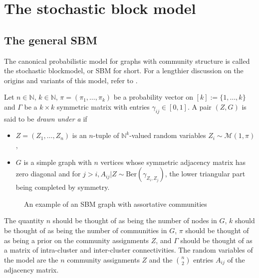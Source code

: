 \documentclass[../../main.tex]{subfiles} %
\begin{document}
\section{The stochastic block model}

\subsection{The general SBM}
The canonical probabilistic model for graphs with community structure is called 
the 
stochastic blockmodel, or SBM for short. For a lengthier discussion on the 
origins and variants of this model, refer to \cite{abbe_community_2017}. 

\begin{definition} \label{def:sbm}
	Let \(n \in \mathbb N\), \(k \in \mathbb N\), \(\pi = (\pi_1, \dots, 
	\pi_k)\) be a probability vector on \([k] := \{1, \dots, k\}\) and  
	\(\Gamma\) be a \(k \times k\) symmetric matrix with entries \(\gamma_{ij} 
	\in [0, 1]\). A pair \((Z, G)\) is said to be \textit{drawn under a 
	} if 
	\begin{itemize}
		\item \(Z = (Z_1, \dots, Z_n)\) is an \(n\)-tuple of \(\mathbb 
		N^k\)-valued random variables \(Z_i \sim \mathcal M (1, \pi)\),
		\item \(G\) is a simple graph with \(n\) vertices whose symmetric 
		adjacency matrix has zero diagonal and for \(j > i, A_{ij} \vert Z \sim 
		\text{Ber}(\gamma_{Z_i, Z_j})\), the lower triangular part being 
		completed by symmetry.
	\end{itemize}
\end{definition}

\begin{figure}[ht]
	\centering
	\caption{An example of an SBM graph with assortative communities}
	\label{fig:sbm-example}
\end{figure}

\begin{remark}
	The quantity \(n\) should be thought of as being the number of nodes in 
	\(G\), \(k\) should be thought of as being the number of communities in 
	\(G\), \(\pi\) should be thought of as being a prior on the community 
	assignments \(Z\), and \(\Gamma\) should be thought of as a matrix of 
	intra-cluster and inter-cluster connectivities. The random variables of the 
	model are the \(n\) community assignments \(Z\) and the \(\binom{n}{2}\) 
	entries \(A_{ij}\) of the adjacency matrix.
\end{remark}
\end{document}
